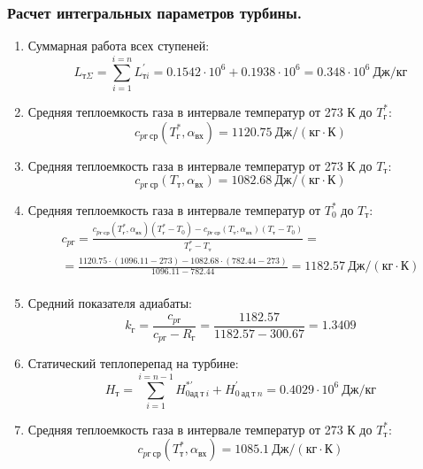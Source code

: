 \documentclass[a4paper,12pt]{article}
\begin{document}
    \subsubsection{Расчет интегральных параметров турбины.}
%     
%    
    \begin{enumerate}

        \item Суммарная работа всех ступеней:
        \[
            L_{т\Sigma} = \sum_{i=1}^{i=n}{L_{тi}^{\prime}} =
            0.1542\cdot 10^6+0.1938\cdot 10^6 = 0.348 \cdot 10^6 \ Дж/кг
        \]

        \item Средняя теплоемкость газа в интервале температур от 273 К до $T_г^*$:
        \[
            c_{pг\ ср} (T_г^*, \alpha_{вх}) =
            1120.75 \ Дж/(кг \cdot К)
        \]

        \item Средняя теплоемкость газа в интервале температур от 273 К до $T_т$:
        \[
            c_{pг\ ср} (T_т, \alpha_{вх}) =
            1082.68 \ Дж/(кг \cdot К)
        \]

        \item Средняя теплоемкость газа в интервале температур от $T_0^*$ до $T_т$:
        \begin{gather*}
            c_{pг} = \frac{
		         c_{pг\ ср} (T_г^*, \alpha_{вх}) (T_г^* - T_0) - c_{pг\ ср} (T_{т}, \alpha_{вх})(T_т - T_0)
		    }{
		        T_г^* - T_т} =\\
            =\frac{
                1120.75 \cdot
                (1096.11 - 273) -
		        1082.68 \cdot
                (782.44 - 273)
		    }{
		        1096.11 - 782.44} =
		    1182.57 \ Дж / (кг \cdot К)\\
        \end{gather*}

        \item Средний показателя адиабаты:
        \[
            k_г = \frac{c_{pг}}{c_{pг} - R_г} =
                \frac{
                    1182.57
                }{
                    1182.57 - 300.67
                }
            = 1.3409
        \]

        \item Статический теплоперепад на турбине:
        \[
            H_т = \sum_{i=1}^{i=n-1}H_{0ад\ т\ i}^{*\prime} + H_{0\ ад\ т\ n}^\prime =
            0.4029 \cdot 10^6 \ Дж/кг
        \]

        \item Средняя теплоемкость газа в интервале температур от 273 К до $T_т^*$:
        \[
            c_{pг\ ср} (T_т^*, \alpha_{вх}) =
            1085.1 \ Дж/(кг \cdot К)
        \]


\end{enumerate}
\end{document}
